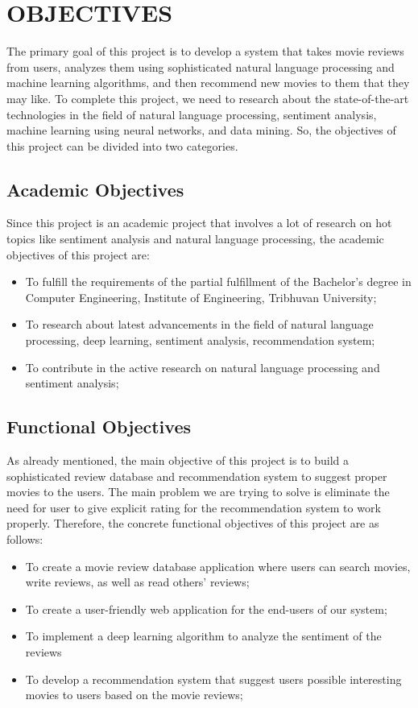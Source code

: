 \section{OBJECTIVES}

The primary goal of this project is to develop a system that takes movie reviews
from users, analyzes them using sophisticated natural language processing and
machine learning algorithms, and then recommend new movies to them that they may
like. To complete this project, we need to research about the state-of-the-art
technologies in the field of natural language processing, sentiment analysis,
machine learning using neural networks, and data mining. So, the objectives of
this project can be divided into two categories.

\subsection{Academic Objectives}

Since this project is an academic project that involves a lot of research on hot
topics like sentiment analysis and natural language processing, the academic
objectives of this project are:

\begin{itemize}
  \item To fulfill the requirements of the partial fulfillment of the Bachelor's
    degree in Computer Engineering, Institute of Engineering, Tribhuvan
    University;
  \item To research about latest advancements in the field of natural language
    processing, deep learning, sentiment analysis, recommendation system;
  \item To contribute in the active research on natural language processing and
    sentiment analysis;
\end{itemize}

\subsection{Functional Objectives}

As already mentioned, the main objective of this project is to build a
sophisticated review database and recommendation system to suggest proper movies
to the users. The main problem we are trying to solve is eliminate the need for
user to give explicit rating for the recommendation system to work properly.
Therefore, the concrete functional objectives of this project are as follows:

\begin{itemize}
  \item To create a movie review database application where users can search
    movies, write reviews, as well as read others' reviews;
  \item To create a user-friendly web application for the end-users of our
    system;
  \item To implement a deep learning algorithm to analyze the sentiment of the
    reviews
  \item To develop a recommendation system that suggest users possible
    interesting movies to users based on the movie reviews;
\end{itemize}
